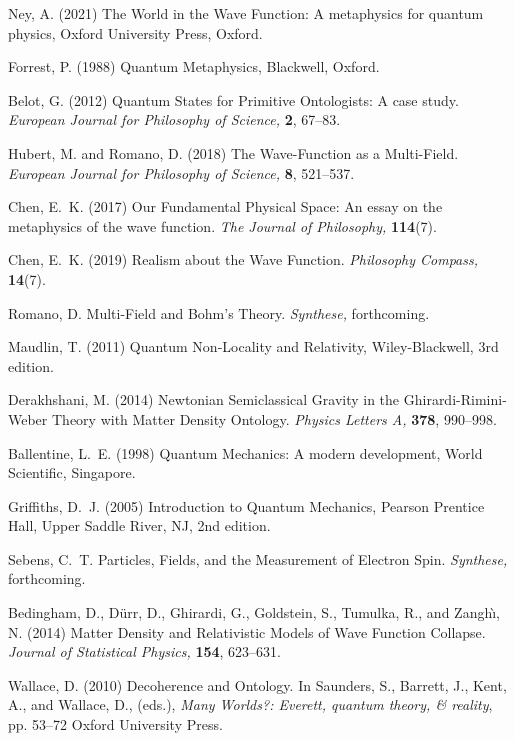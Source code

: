 \documentclass[12pt,onecolumn,secnumarabic,amsmath,amssymb,balancelastpage,nofootinbib]{article}
\begin{document}
\begin{thebibliography}{100}
Ney, A. (2021)
The World in the Wave Function: A metaphysics for quantum physics,
Oxford University Press, Oxford.

Forrest, P. (1988)
Quantum Metaphysics,
Blackwell, Oxford.

Belot, G. (2012)
Quantum States for Primitive Ontologists: A case study.
{\em European Journal for Philosophy of Science,} {\bf 2}, 67--83.

Hubert, M. and Romano, D. (2018)
The Wave-Function as a Multi-Field.
{\em European Journal for Philosophy of Science,} {\bf 8}, 521--537.

Chen, E.~K. (2017)
Our Fundamental Physical Space: An essay on the metaphysics of the wave
  function.
{\em The Journal of Philosophy,} {\bf 114}(7).

Chen, E.~K. (2019)
Realism about the Wave Function.
{\em Philosophy Compass,} {\bf 14}(7).

Romano, D.
Multi-Field and Bohm's Theory.
{\em Synthese,}
forthcoming.

Maudlin, T. (2011)
Quantum Non-Locality and Relativity,
Wiley-Blackwell,  3rd edition.

Derakhshani, M. (2014)
Newtonian Semiclassical Gravity in the Ghirardi-Rimini-Weber Theory with Matter
  Density Ontology.
{\em Physics Letters A,} {\bf 378}, 990--998.

Ballentine, L.~E. (1998)
Quantum Mechanics: A modern development,
World Scientific, Singapore.

Griffiths, D.~J. (2005)
Introduction to Quantum Mechanics,
Pearson Prentice Hall, Upper Saddle River, NJ, 2nd edition.

Sebens, C.~T.
Particles, Fields, and the Measurement of Electron Spin.
{\em Synthese,}
forthcoming.

Bedingham, D., D\"urr, D., Ghirardi, G., Goldstein, S., Tumulka, R., and
  Zangh\`{\i}, N. (2014)
Matter Density and Relativistic Models of Wave Function Collapse.
{\em Journal of Statistical Physics,} {\bf 154}, 623--631.

Wallace, D. (2010)
Decoherence and Ontology.
In Saunders, S., Barrett, J., Kent, A., and Wallace, D., (eds.), \emph{Many
  Worlds?: Everett, quantum theory, \& reality},  pp. 53--72 Oxford University
  Press.


\end{thebibliography}
\end{document}
